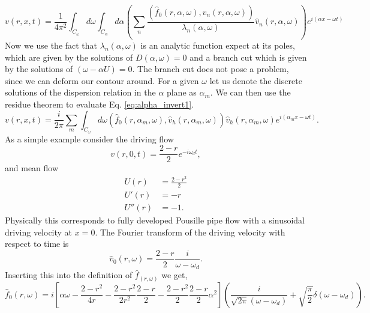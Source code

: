 \documentclass[superscriptaddress, onecolumn, prl]{revtex4}
\begin{document}
\begin{equation}
\label{eq:alpha_invert1}
{v}(r, x, t) = \frac{1}{4 \pi^2}\int_{C_\omega} d \omega \int_{C_\alpha} d\alpha \left(\sum_n \frac{(\hat{f}_0(r, \alpha, \omega), \hat{v}_n(r, \alpha, \omega))}{\lambda_n(\alpha, \omega)} \hat{v}_n(r, \alpha, \omega) \right) e^{i (\alpha x - \omega t)} 
\end{equation} 
Now we use the fact that $\lambda_n(\alpha, \omega)$ is an analytic function expect at its poles, which are given by the solutions of $D(\alpha, \omega)=0$ and a branch cut which is given by the solutions of $\left(\omega  - \alpha U \right)=0$. The branch cut does not pose a problem, since we can deform our contour around. For a given $\omega$ let us denote the discrete solutions of the dispersion relation in the $\alpha$ plane as $\alpha_m$. We can then use the residue theorem to evaluate Eq. \ref{eq:alpha_invert1}.
\begin{equation}
\label{eq:alpha_invert2}
v(r, x, t) = \frac{i}{2 \pi} \sum_m \int_{C_\omega} d \omega (\hat{f}_0(r, \alpha_m, \omega), \hat{v}_h(r, \alpha_m, \omega)) \hat{v}_h(r, \alpha_m, \omega) e^{i (\alpha_m x - \omega t)}. 
\end{equation}
As a simple example consider the driving flow 
\begin{equation}
v(r,0,t)=\frac{2-r}{2}e^{-i \omega_d t},
\end{equation}
and mean flow
\begin{equation}
\begin{split}
U(r) &= \frac{2-r^2}{2} \\
U'(r) &= -r \\
U''(r) &= -1.
\end{split}
\end{equation}
Physically this corresponds to fully developed Pousille pipe flow with a sinusoidal driving velocity at $x=0$. The Fourier transform of the driving velocity with respect to time is
\begin{equation}
\hat{v}_0(r,\omega) = \frac{2-r}{2} \frac{i}{\omega - \omega_d}.
\end{equation} 
Inserting this into the definition of $\hat{f}_(r,\omega)$ we get,
\begin{equation}
\hat{f}_0(r,\omega) = i \left[ \alpha \omega- \frac{2-r^2}{4 r} -\frac{2-r^2}{2 r^2}\frac{2-r}{2} - \frac{2-r^2}{2}\frac{2-r}{2}\alpha^2 \right] \left( \frac{i}{\sqrt{2 \pi} (\omega - \omega_d)} + \sqrt{\frac{\pi}{2}} \delta(\omega - \omega_d) \right).
\end{equation}
\end{document}

